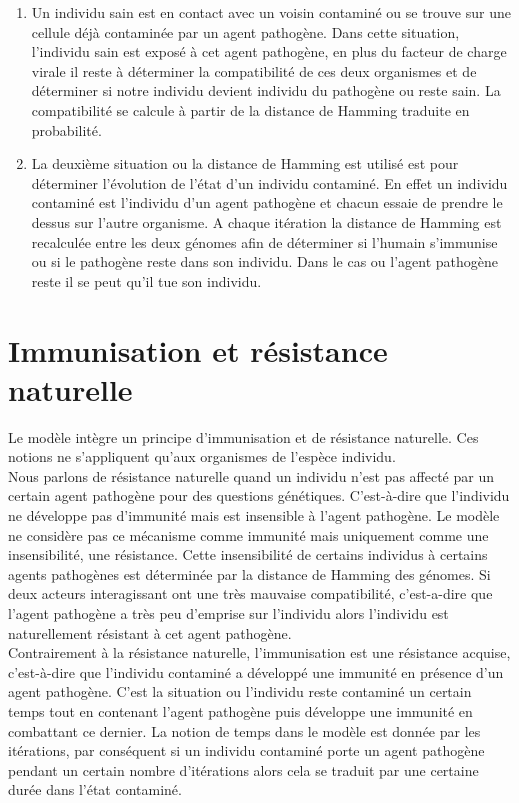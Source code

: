 \begin{enumerate}
	\item Un individu sain est en contact avec un voisin contaminé ou se trouve sur une cellule déjà contaminée par un agent pathogène. Dans cette situation, l'individu sain est exposé à cet agent pathogène, en plus du facteur de charge virale il reste à déterminer la compatibilité de ces deux organismes et de déterminer si notre individu devient individu du pathogène ou reste sain. La compatibilité se calcule à partir de la distance de Hamming traduite en probabilité.
	\item La deuxième situation ou la distance de Hamming est utilisé est pour déterminer l'évolution de l'état d'un individu contaminé. En effet un individu contaminé est l'individu d'un agent pathogène et chacun essaie de prendre le dessus sur l'autre organisme. A chaque itération la distance de Hamming est recalculée entre les deux génomes afin de déterminer si l'humain s'immunise ou si le pathogène reste dans son individu. Dans le cas ou l'agent pathogène reste il se peut qu'il tue son individu.
\end{enumerate}

\section{Immunisation et résistance naturelle}

Le modèle intègre un principe d'immunisation et de résistance naturelle. Ces notions ne s'appliquent qu'aux organismes de l'espèce individu.\\

Nous parlons de résistance naturelle quand un individu n'est pas affecté par un certain agent pathogène pour des questions génétiques. C'est-à-dire que l'individu ne développe pas d'immunité mais est insensible à l'agent pathogène. Le modèle ne considère pas ce mécanisme comme immunité mais uniquement comme une insensibilité, une résistance. Cette insensibilité de certains individus à certains agents pathogènes est déterminée par la distance de Hamming des génomes. Si deux acteurs interagissant ont une très mauvaise compatibilité, c'est-a-dire que l'agent pathogène a très peu d'emprise sur l'individu alors l'individu est naturellement résistant à cet agent pathogène.\\

Contrairement à la résistance naturelle, l'immunisation est une résistance acquise, c'est-à-dire que l'individu contaminé a développé une immunité en présence d'un agent pathogène. C'est la situation ou l'individu reste contaminé un certain temps tout en contenant l'agent pathogène puis développe une immunité en combattant ce dernier. La notion de temps dans le modèle est donnée par les itérations, par conséquent si un individu contaminé porte un agent pathogène pendant un certain nombre d'itérations alors cela se traduit par une certaine durée dans l'état contaminé.\\

